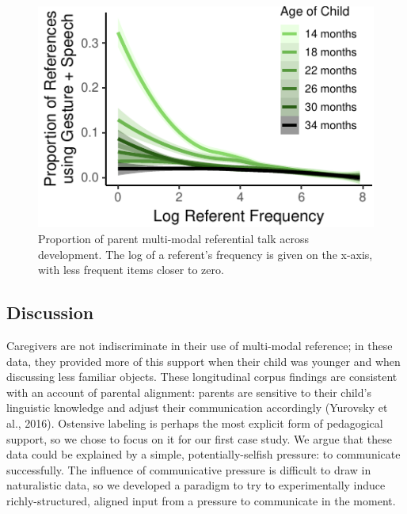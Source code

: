 \documentclass[10pt, letterpaper]{article}
\newenvironment{CodeChunk}{}{}
\begin{document}
\begin{CodeChunk}
\begin{figure}[tb]

{\centering \includegraphics{figs/corpus_plot-1} 

}

\caption[Proportion of parent multi-modal referential talk across development]{Proportion of parent multi-modal referential talk across development. The log of a referent's frequency is given on the x-axis, with less frequent items closer to zero.}\label{fig:corpus_plot}
\end{figure}
\end{CodeChunk}

\subsection{Discussion}\label{discussion}

Caregivers are not indiscriminate in their use of multi-modal reference;
in these data, they provided more of this support when their child was
younger and when discussing less familiar objects. These longitudinal
corpus findings are consistent with an account of parental alignment:
parents are sensitive to their child's linguistic knowledge and adjust
their communication accordingly (Yurovsky et al., 2016). Ostensive
labeling is perhaps the most explicit form of pedagogical support, so we
chose to focus on it for our first case study. We argue that these data
could be explained by a simple, potentially-selfish pressure: to
communicate successfully. The influence of communicative pressure is
difficult to draw in naturalistic data, so we developed a paradigm to
try to experimentally induce richly-structured, aligned input from a
pressure to communicate in the moment.
\end{document}
